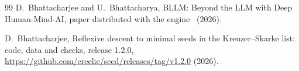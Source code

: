 \documentclass[manuscript]{aomart}
\theoremstyle{definition}
\theoremstyle{remark}
\begin{document}
\begin{thebibliography}{99}
D.~Bhattacharjee and U.~Bhattacharya, BLLM: Beyond the LLM with Deep
Human-Mind-AI, paper distributed with the engine~\cite{Ana26} (2026).

D.~Bhattacharjee, Reflexive descent to minimal seeds in the
Kreuzer--Skarke list: code, data and checks, release 1.2.0,
\url{https://github.com/creelie/seed/releases/tag/v1.2.0} (2026).

\end{thebibliography}
\endgroup
\end{document}
